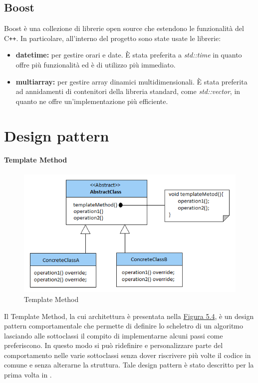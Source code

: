 \subsection{Boost}
Boost  è una collezione di librerie open source che estendono le funzionalità del C\texttt{++}. In particolare, all'interno del progetto sono state usate le librerie:
\begin{itemize}
    \item \textbf{date\textunderscore time:} per gestire orari e date. È stata preferita a \textit{std::time} in quanto offre più funzionalità ed è di utilizzo più immediato.
    \item\textbf{multi\textunderscore array:} per gestire array dinamici multidimensionali. È stata preferita ad annidamenti di contenitori della libreria standard, come \textit{std::vector}, in quanto ne offre un'implementazione più efficiente.
\end{itemize}
\section{Design pattern}
\paragraph{Template Method}
\begin{figure}[!h]
    \label{fig54}
    \centering
        \includegraphics[width=12cm,keepaspectratio]{../immagini/templatemethod.png}
        \caption{Template Method}
\end{figure}
Il Template Method, la cui architettura è presentata nella \hyperref[fig54]{Figura 5.4}, è un design pattern comportamentale che permette di definire lo scheletro di un algoritmo lasciando alle sottoclassi il compito di implementarne alcuni passi come preferiscono. In questo modo si può ridefinire e personalizzare parte del comportamento nelle varie sottoclassi senza dover riscrivere più volte il codice in comune e senza alterarne la struttura. Tale design pattern è stato descritto per la prima volta in \cite{gof:dp}.

